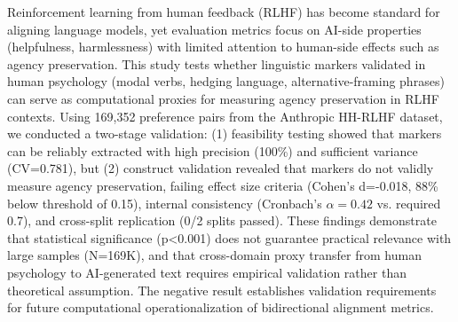 
Reinforcement learning from human feedback (RLHF) has become standard for aligning language models, yet evaluation metrics focus on AI-side properties (helpfulness, harmlessness) with limited attention to human-side effects such as agency preservation. This study tests whether linguistic markers validated in human psychology (modal verbs, hedging language, alternative-framing phrases) can serve as computational proxies for measuring agency preservation in RLHF contexts. Using 169,352 preference pairs from the Anthropic HH-RLHF dataset, we conducted a two-stage validation: (1) feasibility testing showed that markers can be reliably extracted with high precision (100\%) and sufficient variance (CV=0.781), but (2) construct validation revealed that markers do not validly measure agency preservation, failing effect size criteria (Cohen's d=-0.018, 88\% below threshold of 0.15), internal consistency (Cronbach's $\alpha =0.42$ vs. required 0.7), and cross-split replication (0/2 splits passed). These findings demonstrate that statistical significance (p<0.001) does not guarantee practical relevance with large samples (N=169K), and that cross-domain proxy transfer from human psychology to AI-generated text requires empirical validation rather than theoretical assumption. The negative result establishes validation requirements for future computational operationalization of bidirectional alignment metrics.
